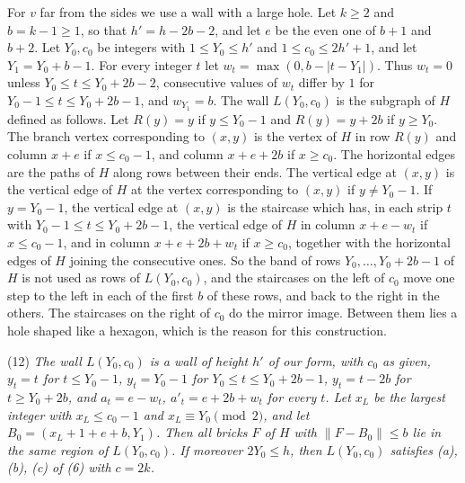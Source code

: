 {For $v$ far from the sides we use a wall with a large hole. Let $k \ge 2$ and $b = k - 1 \ge 1$, so that $h' = h - 2b - 2$, and let $e$ be the even one of $b + 1$ and $b + 2$. Let $Y_0, c_0$ be integers with $1 \le Y_0 \le h'$ and $1 \le c_0 \le 2h' + 1$, and let $Y_1 = Y_0 + b - 1$. For every integer $t$ let $w_t = \max(0, b - |t - Y_1|)$. Thus $w_t = 0$ unless $Y_0 \le t \le Y_0 + 2b - 2$, consecutive values of $w_t$ differ by $1$ for $Y_0 - 1 \le t \le Y_0 + 2b - 1$, and $w_{Y_1} = b$. The wall $L(Y_0, c_0)$ is the subgraph of $H$ defined as follows. Let $R(y) = y$ if $y \le Y_0 - 1$ and $R(y) = y + 2b$ if $y \ge Y_0$. The branch vertex corresponding to $(x, y)$ is the vertex of $H$ in row $R(y)$ and column $x + e$ if $x \le c_0 - 1$, and column $x + e + 2b$ if $x \ge c_0$. The horizontal edges are the paths of $H$ along rows between their ends. The vertical edge at $(x, y)$ is the vertical edge of $H$ at the vertex corresponding to $(x, y)$ if $y \ne Y_0 - 1$. If $y = Y_0 - 1$, the vertical edge at $(x, y)$ is the staircase which has, in each strip $t$ with $Y_0 - 1 \le t \le Y_0 + 2b - 1$, the vertical edge of $H$ in column $x + e - w_t$ if $x \le c_0 - 1$, and in column $x + e + 2b + w_t$ if $x \ge c_0$, together with the horizontal edges of $H$ joining the consecutive ones. So the band of rows $Y_0, \dots, Y_0 + 2b - 1$ of $H$ is not used as rows of $L(Y_0, c_0)$, and the staircases on the left of $c_0$ move one step to the left in each of the first $b$ of these rows, and back to the right in the others. The staircases on the right of $c_0$ do the mirror image. Between them lies a hole shaped like a hexagon, which is the reason for this construction.

\hspace*{12pt}(12) \textit{The wall $L(Y_0, c_0)$ is a wall of height $h'$ of our form, with $c_0$ as given, $y_t = t$ for $t \le Y_0 - 1$, $y_t = Y_0 - 1$ for $Y_0 \le t \le Y_0 + 2b - 1$, $y_t = t - 2b$ for $t \ge Y_0 + 2b$, and $a_t = e - w_t$, $a'_t = e + 2b + w_t$ for every $t$. Let $x_L$ be the largest integer with $x_L \le c_0 - 1$ and $x_L \equiv Y_0 \pmod 2$, and let $B_0 = (x_L + 1 + e + b, Y_1)$. Then all bricks $F$ of $H$ with $\|F - B_0\| \le b$ lie in the same region of $L(Y_0, c_0)$. If moreover $2Y_0 \le h$, then $L(Y_0, c_0)$ satisfies (a), (b), (c) of (6) with $c = 2k$.}

}
